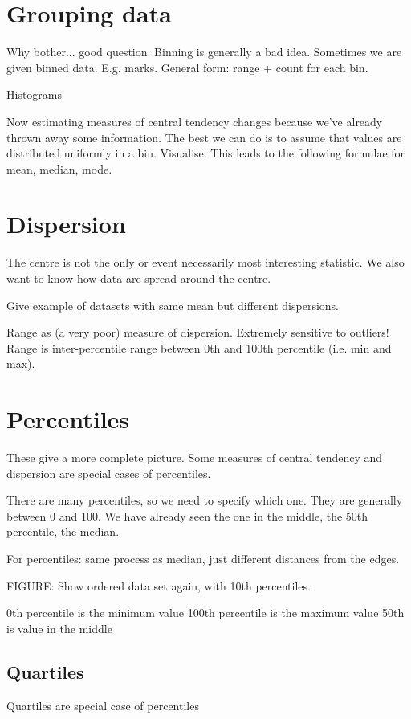 \documentclass[a4paper,11pt]{report}
\begin{document}
\section{Grouping data}

Why bother... good question. Binning is generally a bad
idea. Sometimes we are given binned data. E.g. marks. General form:
range + count for each bin.

Histograms

Now estimating measures of central tendency changes because we've
already thrown away some information. The best we can do is to assume
that values are distributed uniformly in a bin. Visualise. This leads
to the following formulae for mean, median, mode.

\section{Dispersion}
The centre is not the only or event necessarily most interesting
statistic. We also want to know how data are spread around the centre.

Give example of datasets with same mean but different dispersions.

Range as (a very poor) measure of dispersion. Extremely sensitive to
outliers! Range is inter-percentile range between 0th and 100th
percentile (i.e. min and max).

\section{Percentiles}

These give a more complete picture. Some measures of central tendency
and dispersion are special cases of percentiles.

There are many percentiles, so we need to specify which one. They are
generally between 0 and 100. We have already seen the one in the
middle, the 50th percentile, the median.

For percentiles: same process as median, just different distances from
the edges.

FIGURE: Show ordered data set again, with 10th percentiles.

0th percentile is the minimum value
100th percentile is the maximum value
50th is value in the middle

\subsection{Quartiles}
Quartiles are special case of percentiles
\end{document}
